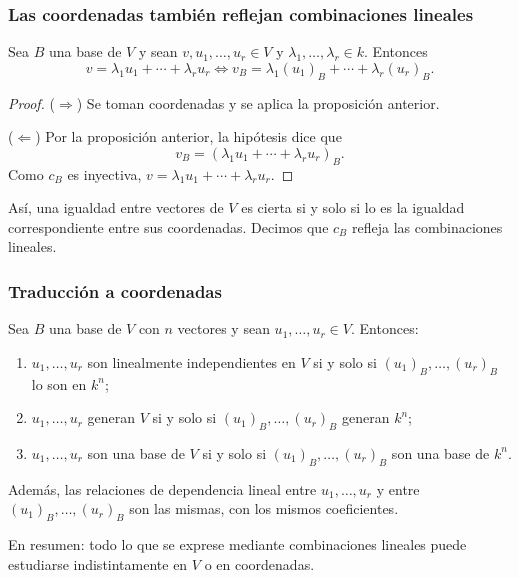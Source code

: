 \begin{frame}
    \frametitle{Las coordenadas también reflejan combinaciones lineales}

    \begin{corollary}
        Sea \(B\) una base de \(V\) y sean \(v,u_1,\ldots,u_r\in V\) y
        \(\lambda_1,\ldots,\lambda_r\in k\). Entonces
        \[
            v=\lambda_1u_1+\cdots+\lambda_ru_r
            \iff
            v_B=\lambda_1(u_1)_B+\cdots+\lambda_r(u_r)_B.
        \]
    \end{corollary}

    \begin{proof}
        (\(\Rightarrow\)) Se toman coordenadas y se aplica la proposición
        anterior.

        (\(\Leftarrow\)) Por la proposición anterior, la hipótesis dice que
        \[
            v_B=(\lambda_1u_1+\cdots+\lambda_ru_r)_B.
        \]
        Como \(c_B\) es inyectiva, \(v=\lambda_1u_1+\cdots+\lambda_ru_r\).
    \end{proof}

    \medskip

    Así, una igualdad entre vectores de \(V\) es cierta si y solo si lo es
    la igualdad correspondiente entre sus coordenadas. Decimos que \(c_B\)
    \alert{refleja} las combinaciones lineales.
\end{frame}


\begin{frame}
    \frametitle{Traducción a coordenadas}

    \begin{theorem}
        Sea \(B\) una base de \(V\) con \(n\) vectores y sean
        \(u_1,\ldots,u_r\in V\). Entonces:
        \begin{enumerate}
            \item \(u_1,\ldots,u_r\) son linealmente independientes en \(V\)
                  si y solo si \((u_1)_B,\ldots,(u_r)_B\) lo son en \(k^n\);
            \item \(u_1,\ldots,u_r\) generan \(V\) si y solo si
                  \((u_1)_B,\ldots,(u_r)_B\) generan \(k^n\);
            \item \(u_1,\ldots,u_r\) son una base de \(V\) si y solo si
                  \((u_1)_B,\ldots,(u_r)_B\) son una base de \(k^n\).
        \end{enumerate}
        Además, las relaciones de dependencia lineal entre
        \(u_1,\ldots,u_r\) y entre \((u_1)_B,\ldots,(u_r)_B\) son
        \alert{las mismas}, con los mismos coeficientes.
    \end{theorem}

    \medskip

    En resumen: todo lo que se exprese mediante combinaciones lineales
    puede estudiarse indistintamente en \(V\) o en coordenadas.
\end{frame}


